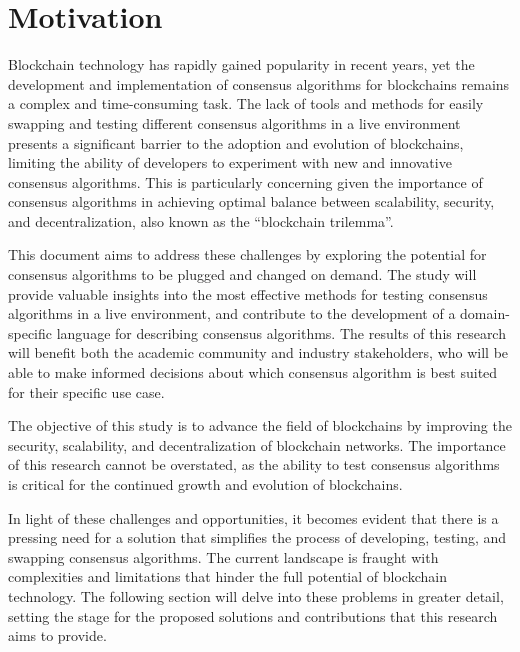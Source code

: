 \section{Motivation}


Blockchain technology has rapidly gained popularity in recent years, yet the development and implementation of consensus algorithms for blockchains remains a complex and time-consuming task. The lack of tools and methods for easily swapping and testing different consensus algorithms in a live environment presents a significant barrier to the adoption and evolution of blockchains, limiting the ability of developers to experiment with new and innovative consensus algorithms. This is particularly concerning given the importance of consensus algorithms in achieving optimal balance between scalability, security, and decentralization, also known as the ``blockchain trilemma''.

This document aims to address these challenges by exploring the potential for consensus algorithms to be plugged and changed on demand. The study will provide valuable insights into the most effective methods for testing consensus algorithms in a live environment, and contribute to the development of a domain-specific language for describing consensus algorithms. The results of this research will benefit both the academic community and industry stakeholders, who will be able to make informed decisions about which consensus algorithm is best suited for their specific use case.

The objective of this study is to advance the field of blockchains by improving the security, scalability, and decentralization of blockchain networks. The importance of this research cannot be overstated, as the ability to test consensus algorithms is critical for the continued growth and evolution of blockchains.

In light of these challenges and opportunities, it becomes evident that there is a pressing need for a solution that simplifies the process of developing, testing, and swapping consensus algorithms. The current landscape is fraught with complexities and limitations that hinder the full potential of blockchain technology. The following section will delve into these problems in greater detail, setting the stage for the proposed solutions and contributions that this research aims to provide.

